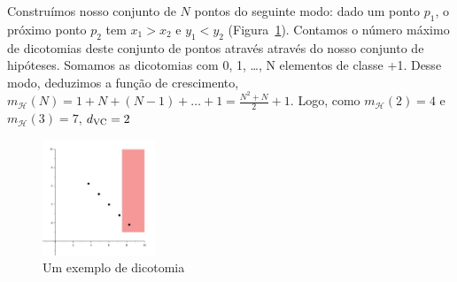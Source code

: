     Construímos nosso conjunto de $N$ pontos do seguinte modo: dado um ponto $p_1$, o próximo ponto $p_2$ tem $x_1 > x_2$ e $y_1 < y_2$ (Figura~\ref{fig:ex15b}). Contamos o número máximo de dicotomias deste conjunto de pontos através através do nosso conjunto de hipóteses. Somamos as dicotomias com 0, 1, \ldots, N elementos de classe +1. Desse modo, deduzimos a função de crescimento, $m_{\mathcal{H}}(N) = 1+N+(N-1)+\ldots+1=\frac{N^2+N}{2}+1$. Logo, como $m_{\mathcal{H}}(2)=4$ e $m_{\mathcal{H}}(3)=7$, $d_{\text{VC}}=2$
    \begin{figure}[h]
	    \includegraphics[width=0.3\textwidth]{ex15b}
	    \caption{Um exemplo de dicotomia}
	    \label{fig:ex15b}
    \end{figure}


